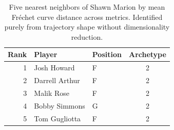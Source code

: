 \begin{table}[htbp]
  \centering\small
  \begin{tabular}{rllc}
    \toprule
    Rank & Player & Position & Archetype \\
    \midrule
    1 & Josh Howard & F & 2 \\
    2 & Darrell Arthur & F & 2 \\
    3 & Malik Rose & F & 2 \\
    4 & Bobby Simmons & G & 2 \\
    5 & Tom Gugliotta & F & 2 \\
    \bottomrule
  \end{tabular}
  \caption{Five nearest neighbors of Shawn Marion by mean Fr\'{e}chet curve distance across metrics. Identified purely from trajectory shape without dimensionality reduction.}
  \label{tab:Shawn_Marion_frechet_curve_neighbors}
\end{table}

